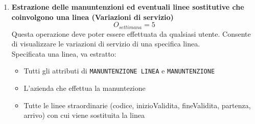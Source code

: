 \documentclass[12pt,a4paper]{report}
\begin{document}
\begin{enumerate}[label=\textbf{\arabic*)}]
    \item \textbf{Estrazione delle manuntenzioni ed eventuali linee sostitutive che coinvolgono una linea (Variazioni di servizio)} \label{op8} \\
	\[{O_{settimana} = 5}\]
	Questa operazione deve poter essere effettuata da qualsiasi utente. Consente di visualizzare le variazioni di servizio di una specifica linea.\\
	Specificata una linea, va estratto:
	\begin{itemize}
	\renewcommand\labelitemi{--}
	    \item Tutti gli attributi di \texttt{MANUNTENZIONE LINEA} e \texttt{MANUNTENZIONE}
	    \item L'azienda che effettua la manuntezione
	    \item Tutte le linee straordinarie (codice, inizioValidita, fineValidita, partenza, arrivo) con cui viene sostituita la linea
	\end{itemize}


\end{enumerate}
\end{document}
